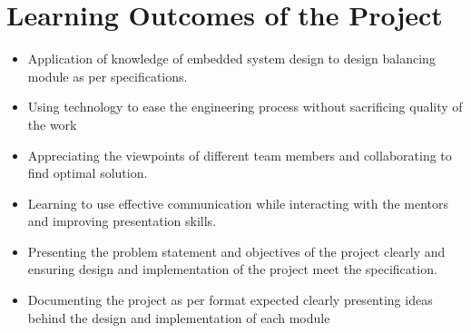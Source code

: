 \section{Learning Outcomes of the Project}
\begin{itemize}
\item Application of knowledge of embedded system design to design balancing module as per specifications.
\item Using technology to ease the engineering process without sacrificing quality of the work
\item Appreciating the viewpoints of different team members and collaborating to find
optimal solution.
\item Learning to use effective communication while interacting with the mentors and
improving presentation skills.
\item Presenting the problem statement and objectives of the project clearly and ensuring
design and implementation of the project meet the specification.
\item Documenting the project as per format expected clearly presenting ideas behind the
design and implementation of each module
\end{itemize}

